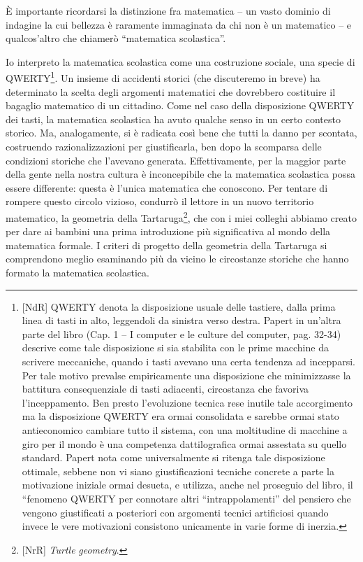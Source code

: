 È importante ricordarsi la distinzione fra matematica – un vasto dominio di indagine la cui bellezza è raramente immaginata da chi non è un matematico – e qualcos'altro che chiamerò “matematica scolastica”.

Io interpreto la matematica scolastica come una costruzione sociale, una specie di QWERTY\footnote{[NdR] QWERTY denota la disposizione usuale delle tastiere, dalla prima linea di tasti in alto, leggendoli da sinistra verso destra. Papert in un'altra parte del libro (Cap. 1 – I computer e le culture del computer, pag. 32-34) descrive come tale disposizione si sia stabilita con le prime macchine da scrivere meccaniche, quando i tasti avevano una certa tendenza ad incepparsi. Per tale motivo prevalse empiricamente una disposizione che minimizzasse la battitura consequenziale di tasti adiacenti, circostanza che favoriva l'inceppamento. Ben presto l'evoluzione tecnica rese inutile tale accorgimento ma la disposizione QWERTY era ormai consolidata e sarebbe ormai stato antieconomico cambiare tutto il sistema, con una moltitudine di macchine a giro per il mondo è una competenza dattilografica ormai assestata su quello standard. Papert nota come universalmente si ritenga tale disposizione ottimale, sebbene non vi siano giustificazioni tecniche concrete a parte la motivazione iniziale ormai desueta, e utilizza, anche nel proseguio del libro, il “fenomeno QWERTY per connotare altri “intrappolamenti” del pensiero che vengono giustificati a posteriori con argomenti tecnici artificiosi quando invece le vere motivazioni consistono unicamente in varie forme di inerzia.}. Un insieme di accidenti storici (che discuteremo in breve) ha determinato la scelta degli argomenti matematici che dovrebbero costituire il bagaglio matematico di un cittadino. Come nel caso della disposizione QWERTY  dei tasti, la matematica scolastica ha avuto qualche senso in un certo contesto storico. Ma, analogamente, si è radicata così bene che tutti la danno per scontata, costruendo razionalizzazioni  per giustificarla, ben dopo la scomparsa delle condizioni storiche che l'avevano generata. Effettivamente, per la maggior parte della gente nella nostra cultura è inconcepibile che la matematica scolastica possa essere differente: questa è l'unica matematica che conoscono. Per tentare di rompere questo circolo vizioso, condurrò il lettore in un nuovo territorio matematico, la geometria della Tartaruga\footnote{[NrR] \textit{Turtle} \textit{geometry}.}, che con i miei colleghi abbiamo creato per dare ai bambini una prima introduzione più significativa al mondo della matematica formale. I criteri di progetto della geometria della Tartaruga si comprendono meglio esaminando più da vicino le circostanze storiche che hanno formato la matematica scolastica.

